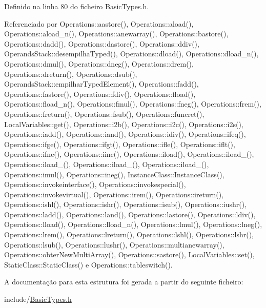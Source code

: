 Definido na linha 80 do ficheiro Basic\+Types.\+h.



Referenciado por Operations\+::aastore(), Operations\+::aload(), Operations\+::aload\+\_\+n(), Operations\+::anewarray(), Operations\+::bastore(), Operations\+::dadd(), Operations\+::dastore(), Operations\+::ddiv(), Operands\+Stack\+::desempilha\+Typed(), Operations\+::dload(), Operations\+::dload\+\_\+n(), Operations\+::dmul(), Operations\+::dneg(), Operations\+::drem(), Operations\+::dreturn(), Operations\+::dsub(), Operands\+Stack\+::empilhar\+Typed\+Element(), Operations\+::fadd(), Operations\+::fastore(), Operations\+::fdiv(), Operations\+::fload(), Operations\+::fload\+\_\+n(), Operations\+::fmul(), Operations\+::fneg(), Operations\+::frem(), Operations\+::freturn(), Operations\+::fsub(), Operations\+::funcret(), Local\+Variables\+::get(), Operations\+::i2b(), Operations\+::i2c(), Operations\+::i2s(), Operations\+::iadd(), Operations\+::iand(), Operations\+::idiv(), Operations\+::ifeq(), Operations\+::ifge(), Operations\+::ifgt(), Operations\+::ifle(), Operations\+::iflt(), Operations\+::ifne(), Operations\+::iinc(), Operations\+::iload(), Operations\+::iload\+\_(), Operations\+::iload\+\_(), Operations\+::iload\+\_(), Operations\+::iload\+\_(), Operations\+::imul(), Operations\+::ineg(), Instance\+Class\+::\+Instance\+Class(), Operations\+::invokeinterface(), Operations\+::invokespecial(), Operations\+::invokevirtual(), Operations\+::irem(), Operations\+::ireturn(), Operations\+::ishl(), Operations\+::ishr(), Operations\+::isub(), Operations\+::iushr(), Operations\+::ladd(), Operations\+::land(), Operations\+::lastore(), Operations\+::ldiv(), Operations\+::lload(), Operations\+::lload\+\_\+n(), Operations\+::lmul(), Operations\+::lneg(), Operations\+::lrem(), Operations\+::lreturn(), Operations\+::lshl(), Operations\+::lshr(), Operations\+::lsub(), Operations\+::lushr(), Operations\+::multianewarray(), Operations\+::obter\+New\+Multi\+Array(), Operations\+::sastore(), Local\+Variables\+::set(), Static\+Class\+::\+Static\+Class() e Operations\+::tableswitch().



A documentação para esta estrutura foi gerada a partir do seguinte ficheiro\+:\begin{DoxyCompactItemize}
\item 
include/\hyperlink{BasicTypes_8h}{Basic\+Types.\+h}\end{DoxyCompactItemize}

